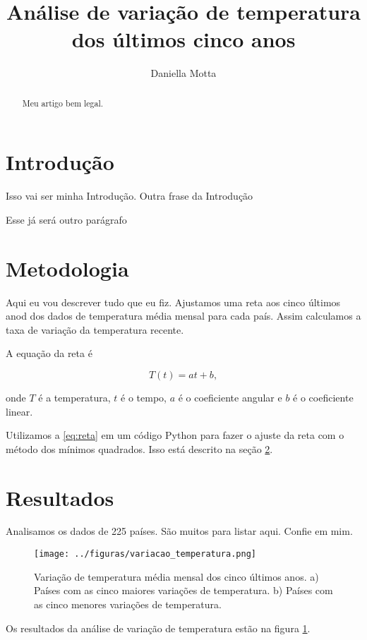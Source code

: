\documentclass{article}
\begin{document}
\title{Análise de variação de temperatura dos últimos cinco anos}
\author{Daniella Motta}

\maketitle
\begin{abstract}
    Meu artigo bem legal.
\end{abstract}


\section{Introdução}
Isso vai ser minha Introdução.
Outra frase da Introdução

Esse já será outro parágrafo

\section{Metodologia}
\label{sec:metodos}

Aqui eu vou descrever tudo que eu fiz.
Ajustamos uma reta aos cinco últimos anod dos dados
de temperatura média mensal para cada país.
Assim calculamos a taxa de variação da temperatura recente.

A equação da reta é

\begin{equation}
T(t) = a t + b,
\label{eq:reta}
\end{equation}

\noindent
onde  $T$ é a temperatura, $t$ é o tempo, $a$ é o coeficiente angular e $b$ é o coeficiente linear.

Utilizamos a \ref{eq:reta} em um código Python para fazer o ajuste da reta com o método dos mínimos quadrados.
Isso está descrito na seção \ref{sec:metodos}.

\section{Resultados}

Analisamos os dados de 225 países. São muitos para listar aqui. Confie em mim.

\begin{figure} [!tb]
    \centering
    \texttt{[image: ../figuras/variacao\_temperatura.png]}
    \caption{
        Variação de temperatura média mensal dos cinco últimos anos.
        a) Países com as cinco maiores variações de temperatura.
        b) Países com as cinco menores variações de temperatura.
    }
    \label{fig:variacao}

\end{figure}
Os resultados da análise de variação de temperatura estão na figura \ref{fig:variacao}.
\end{document}
